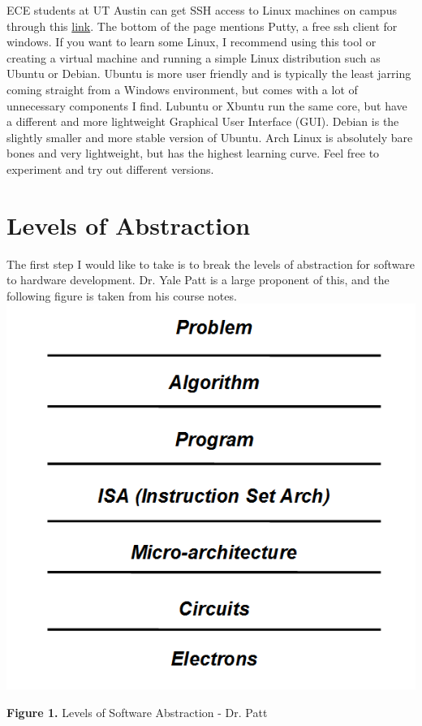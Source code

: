 \documentclass[paper=a4, fontsize=11pt]{scrartcl}
\numberwithin{equation}{section}		%
\numberwithin{figure}{section}			%
\numberwithin{table}{section}			%
\begin{document}
ECE students at UT Austin can get SSH access to Linux machines on campus through this \href{http://www.ece.utexas.edu/it/remote-Linux}{link}. The bottom of the page mentions Putty, a free ssh client for windows. If you want to learn some Linux, I recommend using this tool or creating a virtual machine and running a simple Linux distribution such as Ubuntu or Debian. Ubuntu is more user friendly and is typically the least jarring coming straight from a Windows environment, but comes with a lot of unnecessary components I find. Lubuntu or Xbuntu run the same core, but have a different and more lightweight Graphical User Interface (GUI). Debian is the slightly smaller and more stable version of Ubuntu. Arch Linux is absolutely bare bones and very lightweight, but has the highest learning curve. Feel free to experiment and try out different versions.

\section{Levels of Abstraction}
The first step I would like to take is to break the levels of abstraction for software to hardware development. Dr. Yale Patt is a large proponent of this, and the following figure is taken from his course notes.
\vskip 0.1in
\includegraphics[width=\textwidth]{images/levels_of_abstraction}
\vskip 0.05in
\centerline{\textbf{Figure 1. }Levels of Software Abstraction - Dr. Patt}
\end{document}
